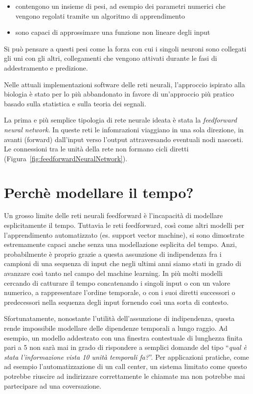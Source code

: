 \begin{itemize}
  \item contengono un insieme di pesi, ad esempio dei parametri numerici che vengono regolati tramite un algoritmo di apprendimento
  \item sono capaci di approssimare una funzione non lineare degli input
\end{itemize}

Si pu\`o pensare a questi pesi come la forza con cui i singoli neuroni sono collegati gli uni con gli altri, collegamenti che vengono attivati durante le fasi di addestramento e predizione.

Nelle attuali implementazioni software delle reti neurali, l'approccio ispirato alla biologia \`e stato per lo pi\`u abbandonato in favore di un'approccio pi\`u pratico basado sulla statistica e sulla teoria dei segnali.

La prima e pi\`u semplice tipologia di rete neurale ideata \`e stata la \emph{feedforward neural network}.
In queste reti le infomrazioni viaggiano in una sola direzione, in avanti (forward) dall'input verso l'output attraversando eventuali nodi nascosti.
Le connessioni tra le unit\`a della rete non formano cicli diretti (Figura~\ref{fig:feedforwardNeuralNetwork}).

\section{Perch\`e modellare il tempo?} %
Un grosso limite delle reti neurali feedforward \`e l'incapacit\`a di modellare esplicitamente il tempo.
Tuttavia le reti feedforward, cos\`i come altri modelli per l'apprendimento automatizzato (es. support vector machine), si sono dimostrate estremamente capaci anche senza una modellazione esplicita del tempo.
Anzi, probabilmente \`e proprio grazie a questa assunzione di indipendenza fra i campioni di una sequenza di input che negli ultimi anni siamo stati in grado di avanzare cos\`i tanto nel campo del machine learning.
In pi\`u molti modelli cercando di catturare il tempo concatenando i singoli input o con un valore numerico, a rappresentare l'ordine temporale, o con i suoi diretti successori o predecessori nella sequenza degli input fornendo cos\`i una sorta di contesto.

Sfortunatamente, nonostante l'utilit\`a dell'assunzione di indipendenza, questa rende impossibile modellare delle dipendenze temporali a lungo raggio.
Ad esempio, un modello addestrato con una finestra contestuale di lunghezza finita pari a 5 non sar\`a mai in grado di rispondere a semplici domande del tipo ``\emph{qual \`e stata l'informazione vista 10 unit\`a temporali fa?}''.
Per applicazioni pratiche, come ad esempio l'automatizzazione di un call center, un sistema limitato come questo potrebbe riuscire ad indirizzare correttamente le chiamate ma non potrebbe mai partecipare ad una coversazione.

